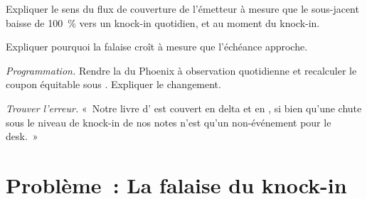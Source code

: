 \begin{exercise}[$\star\star$]\label{exo:dv:autocallables:5}
Expliquer le sens du flux de couverture de l'émetteur à mesure que le sous-jacent baisse de 100~\% vers un knock-in quotidien, et au moment du knock-in.
\end{exercise}

\begin{exercise}[$\star\star$]\label{exo:dv:autocallables:6}
Expliquer pourquoi la falaise croît à mesure que l'échéance approche.
\end{exercise}

\begin{exercise}[$\star\star\star$]\label{exo:dv:autocallables:7}
\emph{Programmation.} Rendre la  du Phoenix à observation quotidienne et recalculer le coupon équitable sous . Expliquer le
changement.
\end{exercise}

\begin{exercise}[$\star\star\star$]\label{exo:dv:autocallables:8}
\emph{Trouver l'erreur.} «~Notre livre d' est couvert en delta et en , si bien qu'une chute sous le niveau de knock-in de nos notes
n'est qu'un non-événement pour le desk.~»
\end{exercise}

\section{Problème~: La falaise du knock-in}

